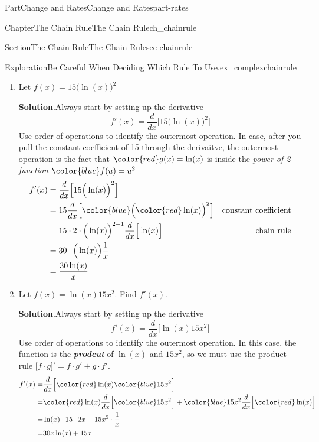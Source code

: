 \documentclass{tufte-book}
\newcommand{\blocktitlefont}{\relax}
\newcommand{\alert}[1]{\textbf{\textit{#1}}}
\numberwithin{equation}{chapter}
\newcommand{\red}[1]{   {\color{red}   #1}   }
\newcommand{\blue}[1]{  {\color{blue}  #1}  }
\newcommand{\ddx}[1]{ \dfrac{d}{dx} \Big[ #1 \Big]  }
\newcommand{\D}[1]{ \Big[ #1 \Big]'  }
\newcommand{\amp}{&}
\begin{document}
\begin{partptx}{Part}{Change and Rates}{}{Change and Rates}{}{}{part-rates}
\begin{chapterptx}{Chapter}{The Chain Rule}{}{The Chain Rule}{}{}{ch_chainrule}
\begin{sectionptx}{Section}{The Chain Rule}{}{The Chain Rule}{}{}{sec-chainrule}
\begin{enumerate}
\end{enumerate}
%
\begin{exploration}{Exploration}{Be Careful When Deciding Which Rule To Use.}{ex_complexchainrule}%
\begin{enumerate}[font=\bfseries,label=(\alph*),ref=\alph*]%
\item{}Let \(f(x) = 15 \Big( \ln(x)\Big)^2\)%
\par\smallskip%
\noindent\textbf{\blocktitlefont Solution}.\hypertarget{ex_complexchainrule-2-2}{}\quad{}Always start by setting up the derivative%
\begin{equation*}
f'(x) = \ddx{ 15 \Big( \ln(x)\Big)^2}
\end{equation*}
Use order of operations to identify the outermost operation. In case, after you pull the constant coefficient of 15 through the derivaitve, the outermost operation is the fact that \(\red{g(x) = \ln(x)}\) is inside the \emph{power of 2 function} \(\blue{f(u) = u^2}\)%
\begin{align*}
f'(x)  \amp =  \ddx{ 15 \Big( \ln(x)\Big)^2} \\
\amp = 15  \ddx{ \blue{\Big( \red{\ln(x)}\Big)^2}} \amp \text{constant coefficient}\\
\amp = 15\cdot  2\cdot \Big( \ln(x)\Big)^{2-1}\ddx{\ln(x)} \amp \text{chain rule}\\
\amp = 30\cdot \Big( \ln(x)\Big)\dfrac{1}{x} \\
\amp = \dfrac{30\ln(x)}{x}
\end{align*}
%
\item{}Let \(f(x) = \ln(x) 15x^2\). Find \(f'(x)\).%
\par\smallskip%
\noindent\textbf{\blocktitlefont Solution}.\hypertarget{ex_complexchainrule-3-2}{}\quad{}Always start by setting up the derivative%
\begin{equation*}
f'(x) = \ddx{\ln(x) 15x^2}
\end{equation*}
Use order of operations to identify the outermost operation.  In this case, the function is the \alert{prodcut} of \(\ln(x)\) and \(15x^2\), so we must use the product rule \(\D{f\cdot g} = f\cdot g' + g\cdot f' \).%
\begin{align*}
f'(x) = \amp \ddx{ \red{\ln(x)} \blue{15x^2} }\\
= \amp \red{\ln(x)}\ddx{ \blue{15x^2} } + \blue{15x^2} \ddx{ \red{\ln(x)} }\\
= \amp \ln(x)\cdot 15\cdot 2x + 15x^2\cdot \frac{1}{x}\\
= \amp 30 x \ln(x) + 15x
\end{align*}

\end{enumerate}
\end{exploration}
\end{sectionptx}
\end{chapterptx}
\end{partptx}
\end{document}
